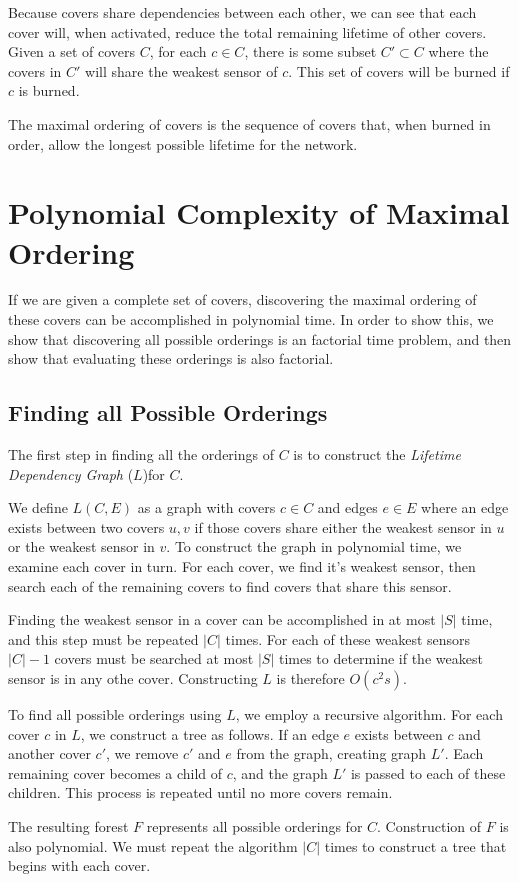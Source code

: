 Because covers share dependencies between each other, we can see that each cover will, when activated, reduce the total remaining lifetime of other covers. Given a set of covers $C$, for each $c \in C$, there is some subset $C' \subset C$ where the covers in $C'$ will share the weakest sensor of $c$. This set of covers will be burned if $c$ is burned. 

The maximal ordering of covers is the sequence of covers that, when burned in order, allow the longest possible lifetime for the network.\cite{978-3-540-89894-8_26}

\section{Polynomial Complexity of Maximal Ordering}
If we are given a complete set of covers, discovering the maximal ordering of these covers can be accomplished in polynomial time. In order to show this, we show that discovering all possible orderings is an factorial time problem, and then show that evaluating these orderings is also factorial.
\subsection{Finding all Possible Orderings}
The first step in finding all the orderings of $C$ is to construct the {\em Lifetime Dependency Graph} ($L$)for $C$.\cite{978-3-540-89894-8_26}

We define $L(C, E)$ as a graph with covers $c \in C$ and edges $e \in E$ where an edge exists between two covers ${u,v}$ if those covers share either the weakest sensor in $u$ or the weakest sensor in $v$. To construct the graph in polynomial time, we examine each cover in turn. For each cover, we find it's weakest sensor, then search each of the remaining covers to find covers that share this sensor. 

Finding the weakest sensor in a cover can be accomplished in at most $|S|$ time, and this step must be repeated $|C|$ times. For each of these weakest sensors $|C|-1$ covers must be searched at most $|S|$ times to determine if the weakest sensor is in any othe cover. Constructing $L$ is therefore $O(c^2s)$.

To find all possible orderings using $L$, we employ a recursive algorithm. For each cover $c$ in $L$, we construct a tree as follows. If an edge $e$ exists between $c$ and another cover $c'$, we remove $c'$ and $e$ from the graph, creating graph $L'$. Each remaining cover becomes a child of $c$, and the graph $L'$ is passed to each of these children. This process is repeated until no more covers remain.

The resulting forest $F$ represents all possible orderings for $C$. Construction of $F$ is also polynomial. We must repeat the algorithm $|C|$ times to construct a tree that begins with each cover.   
